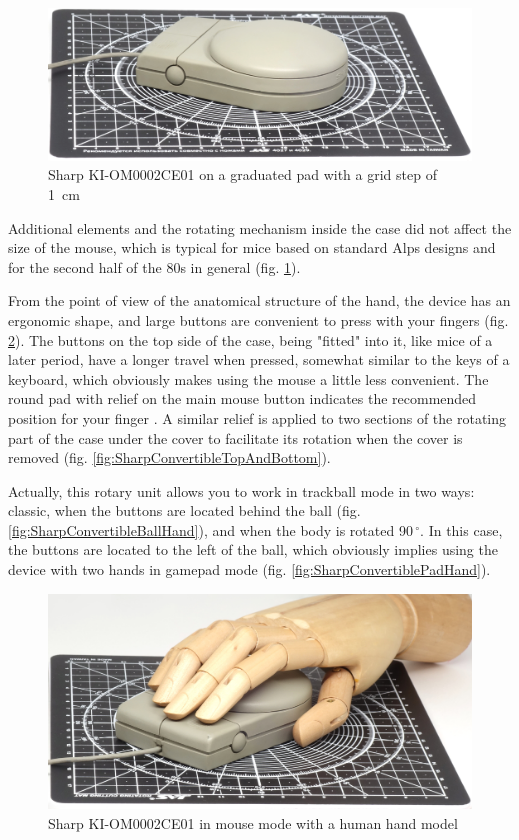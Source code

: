 \documentclass[11pt, a4paper]{article}
\begin{document}
\begin{figure}[h]
    \centering
    \includegraphics[scale=0.5]{1987_sharp_convertible/size_30.jpg}
    \caption{Sharp KI-OM0002CE01 on a graduated pad with a grid step of 1~cm}
    \label{fig:SharpConvertibleSize}
\end{figure}

Additional elements and the rotating mechanism inside the case did not affect the size of the mouse, which is typical for mice based on standard Alps designs and for the second half of the 80s in general (fig. \ref{fig:SharpConvertibleSize}).

From the point of view of the anatomical structure of the hand, the device has an ergonomic shape, and large buttons are convenient to press with your fingers (fig. \ref{fig:SharpConvertibleHand}). The buttons on the top side of the case, being "fitted" into it, like mice of a later period, have a longer travel when pressed, somewhat similar to the keys of a keyboard, which obviously makes using the mouse a little less convenient. The round pad with relief on the main mouse button indicates the recommended position for your finger \cite{JapaneseClickSense}. A similar relief is applied to two sections of the rotating part of the case under the cover to facilitate its rotation when the cover is removed (fig. \ref{fig:SharpConvertibleTopAndBottom}).

Actually, this rotary unit allows you to work in trackball mode in two ways: classic, when the buttons are located behind the ball (fig. \ref{fig:SharpConvertibleBallHand}), and when the body is rotated 90\,$^\circ$. In this case, the buttons are located to the left of the ball, which obviously implies using the device with two hands in gamepad mode (fig. \ref{fig:SharpConvertiblePadHand}).

\begin{figure}[h]
    \centering
    \includegraphics[scale=0.44]{1987_sharp_convertible/handmouse_15.jpg}
    \caption{Sharp KI-OM0002CE01 in mouse mode with a human hand model}
    \label{fig:SharpConvertibleHand}
\end{figure}
\end{document}
